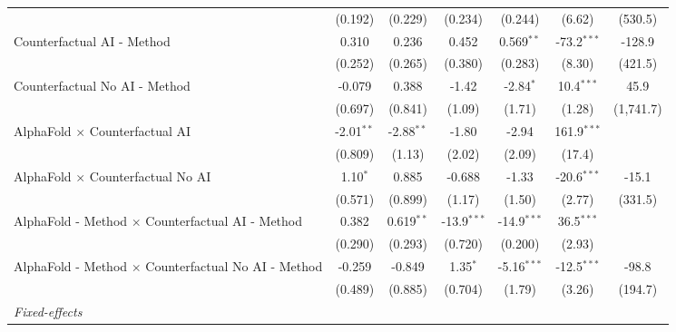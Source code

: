 \begin{tabular}{lcccccc}
                                                              & (0.192)       & (0.229)       & (0.234)       & (0.244)       & (6.62)        & (530.5)\\   
   Counterfactual AI - Method                                 & 0.310         & 0.236         & 0.452         & 0.569$^{**}$  & -73.2$^{***}$ & -128.9\\   
                                                              & (0.252)       & (0.265)       & (0.380)       & (0.283)       & (8.30)        & (421.5)\\   
   Counterfactual No AI - Method                              & -0.079        & 0.388         & -1.42         & -2.84$^{*}$   & 10.4$^{***}$  & 45.9\\   
                                                              & (0.697)       & (0.841)       & (1.09)        & (1.71)        & (1.28)        & (1,741.7)\\   
   AlphaFold $\times$ Counterfactual AI                       & -2.01$^{**}$  & -2.88$^{**}$  & -1.80         & -2.94         & 161.9$^{***}$ &   \\   
                                                              & (0.809)       & (1.13)        & (2.02)        & (2.09)        & (17.4)        &   \\   
   AlphaFold $\times$ Counterfactual No AI                    & 1.10$^{*}$    & 0.885         & -0.688        & -1.33         & -20.6$^{***}$ & -15.1\\   
                                                              & (0.571)       & (0.899)       & (1.17)        & (1.50)        & (2.77)        & (331.5)\\   
   AlphaFold - Method $\times$ Counterfactual AI - Method     & 0.382         & 0.619$^{**}$  & -13.9$^{***}$ & -14.9$^{***}$ & 36.5$^{***}$  &   \\   
                                                              & (0.290)       & (0.293)       & (0.720)       & (0.200)       & (2.93)        &   \\   
   AlphaFold - Method $\times$ Counterfactual No AI - Method  & -0.259        & -0.849        & 1.35$^{*}$    & -5.16$^{***}$ & -12.5$^{***}$ & -98.8\\   
                                                              & (0.489)       & (0.885)       & (0.704)       & (1.79)        & (3.26)        & (194.7)\\   
   \midrule
   \emph{Fixed-effects}\\

\end{tabular}
